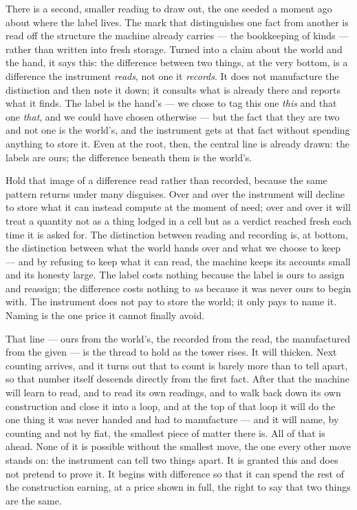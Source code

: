There is a second, smaller reading to draw out, the one seeded a moment ago about where the label lives. The mark
that distinguishes one fact from another is read off the structure the machine already carries --- the
bookkeeping of kinds --- rather than written into fresh storage. Turned into a claim about the world and the
hand, it says this: the difference between two things, at the very bottom, is a difference the instrument
\emph{reads}, not one it \emph{records}. It does not manufacture the distinction and then note it down; it
consults what is already there and reports what it finds. The label is the hand's --- we chose to tag this one
\emph{this} and that one \emph{that}, and we could have chosen otherwise --- but the fact that they are two and
not one is the world's, and the instrument gets at that fact without spending anything to store it. Even at the
root, then, the central line is already drawn: the labels are ours; the difference beneath them is
the world's.

Hold that image of a difference read rather than recorded, because the same pattern returns under many disguises.
Over and over the instrument will decline to store what it can instead
compute at the moment of need; over and over it will treat a quantity not as a thing lodged in a cell but as a
verdict reached fresh each time it is asked for. The distinction between reading and recording is, at bottom, the
distinction between what the world hands over and what we choose to keep --- and by refusing to keep what it can
read, the machine keeps its accounts small and its honesty large. The label costs nothing because the label is
ours to assign and reassign; the difference costs nothing to \emph{us} because it was never ours to begin with.
The instrument does not pay to store the world; it only pays to name it. Naming is the one price it cannot finally
avoid.

That line --- ours from the world's, the recorded from the read, the manufactured from the given --- is the
thread to hold as the tower rises. It will thicken. Next counting arrives, and it turns out
that to count is barely more than to tell apart, so that number itself descends directly from the first fact.
After that the machine will learn to read, and to read its own readings, and to walk back down its own
construction and close it into a loop, and at the top of that loop it will do the one thing it was never handed
and had to manufacture --- and it will name, by counting and not by fiat, the smallest piece of matter there is.
All of that is ahead. None of it is possible without the smallest move, the one every other move stands on: the
instrument can tell two things apart. It is granted this and does not pretend to prove it. It begins with
difference so that it can spend the rest of the construction earning, at a price shown in full, the right to say
that two things are the same.
